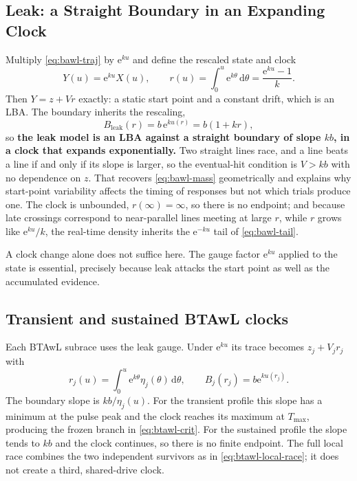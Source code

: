 \documentclass[12pt]{article}
\newcommand{\dd}{\,\mathrm{d}}
\newcommand{\e}{\mathrm{e}}
\theoremstyle{remark}
\begin{document}
\subsection{Leak: a Straight Boundary in an Expanding Clock}
Multiply \eqref{eq:bawl-traj} by $\e^{ku}$ and define the rescaled state and clock
\begin{equation}
  Y(u) = \e^{ku}X(u),
  \qquad
  r(u) = \int_0^{u}\e^{k\theta}\dd\theta = \frac{\e^{ku}-1}{k}.
\end{equation}
Then $Y = z + Vr$ exactly: a static start point and a constant drift, which is an LBA. The boundary inherits the rescaling,
\begin{equation}
  B_{\mathrm{leak}}(r) = b\,\e^{ku(r)} = b\left(1 + kr\right),
  \label{eq:bawl-boundary}
\end{equation}
so \textbf{the leak model is an LBA against a straight boundary of slope $kb$, in a clock that expands exponentially.} Two straight lines race, and a line beats a line if and only if its slope is larger, so the eventual-hit condition is $V > kb$ with no dependence on $z$. That recovers \eqref{eq:bawl-mass} geometrically and explains why start-point variability affects the timing of responses but not which trials produce one. The clock is unbounded, $r(\infty) = \infty$, so there is no endpoint; and because late crossings correspond to near-parallel lines meeting at large $r$, while $r$ grows like $\e^{ku}/k$, the real-time density inherits the $\e^{-ku}$ tail of
\eqref{eq:bawl-tail}.

A clock change alone does not suffice here. The gauge factor $\e^{ku}$ applied to the state is essential, precisely because leak attacks the start point as well as the accumulated evidence.

\subsection{Transient and sustained BTAwL clocks}
Each BTAwL subrace uses the leak gauge.  Under $\e^{ku}$ its trace becomes $z_j+V_jr_j$ with
\[
  r_j(u)=\int_0^u\e^{k\theta}\eta_j(\theta)\dd\theta,
  \qquad
  B_j(r_j)=b\e^{ku(r_j)}.
\]
The boundary slope is $kb/\eta_j(u)$.  For the transient profile this slope has a minimum at the pulse peak and the clock reaches its maximum at $T_{\max}$, producing the frozen branch in \eqref{eq:btawl-crit}.  For the sustained profile the slope tends to $kb$ and the clock continues, so there is no finite endpoint.  The full local race combines the two independent survivors as in \eqref{eq:btawl-local-race}; it does not create a third, shared-drive clock.
\end{document}
